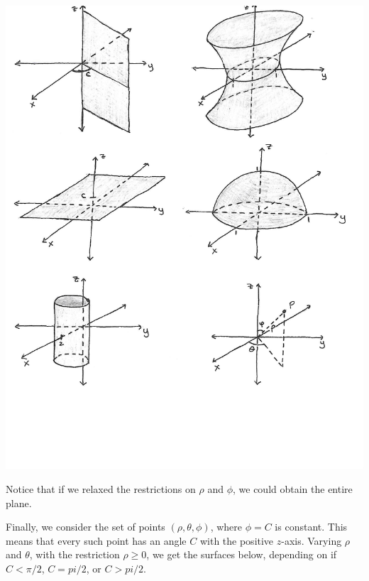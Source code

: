 \documentclass{ximera}
\begin{document}
\begin{image}
\includegraphics{theta_constant}
\end{image}

Notice that if we relaxed the restrictions on $\rho$ and $\phi$, we could obtain the entire plane.

Finally, we consider the set of points $(\rho, \theta, \phi)$, where $\phi = C$ is constant. This means that every such point has an angle $C$ with the positive $z$-axis. Varying $\rho$ and $\theta$, with the restriction $\rho\geq 0$, we get the surfaces below, depending on if $C<\pi/2$, $C=pi/2$, or $C>pi/2$.
\end{document}
